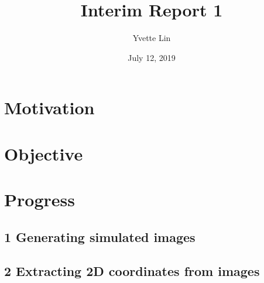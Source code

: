 \documentclass[11pt]{article}
\title{Interim Report 1}
\author{Yvette Lin}
\date{July 12, 2019}
\begin{document}
\maketitle

\section*{Motivation}

\lipsum[3]

\section*{Objective}

\lipsum[3]

\section*{Progress}

\lipsum[3]

\subsection*{1 Generating simulated images}

\lipsum[3]

\subsection*{2 Extracting 2D coordinates from images}

\lipsum[3]
\end{document}
